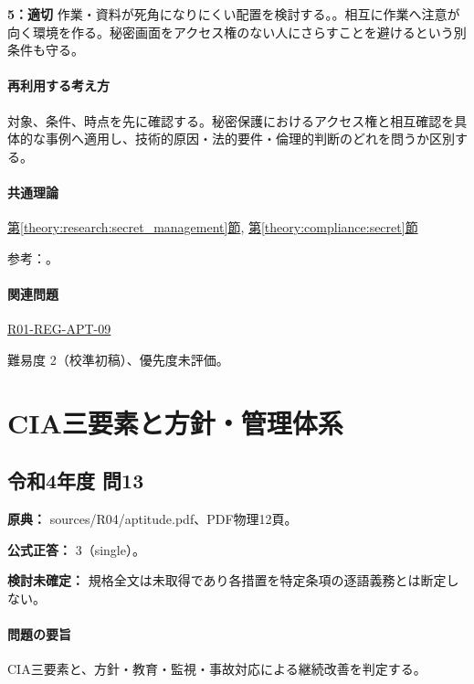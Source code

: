 \noindent\textbf{5：適切} 作業・資料が死角になりにくい配置を検討する。。相互に作業へ注意が向く環境を作る。秘密画面をアクセス権のない人にさらすことを避けるという別条件も守る。\par

\paragraph{再利用する考え方} 対象、条件、時点を先に確認する。秘密保護におけるアクセス権と相互確認を具体的な事例へ適用し、技術的原因・法的要件・倫理的判断のどれを問うか区別する。

\paragraph{共通理論} \hyperref[theory:research:secret_management]{第\ref*{theory:research:secret_management}節}, \hyperref[theory:compliance:secret]{第\ref*{theory:compliance:secret}節}

\par 参考：\cite{meti_secret_handbook2024}。

\paragraph{関連問題} \hyperref[q:r01-reg-apt-09]{R01-REG-APT-09}

\par 難易度 2（校準初稿）、優先度未評価。

\section{CIA三要素と方針・管理体系}

\subsection{令和4年度 問13}
\label{q:r04-reg-apt-13}

\noindent\textbf{原典：} sources/R04/aptitude.pdf、PDF物理12頁。

\textbf{公式正答：} 3（single）。

\par\textbf{検討未確定：} 規格全文は未取得であり各措置を特定条項の逐語義務とは断定しない。

\paragraph{問題の要旨} CIA三要素と、方針・教育・監視・事故対応による継続改善を判定する。

